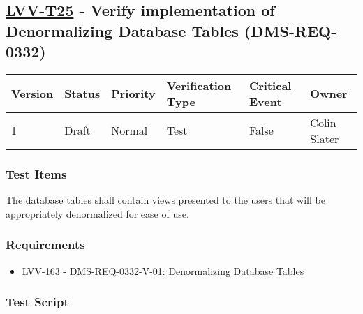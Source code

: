 \hypertarget{lvv-t25---verify-implementation-of-denormalizing-database-tables-dms-req-0332}{%
\subsection{\texorpdfstring{\href{https://jira.lsstcorp.org/secure/Tests.jspa\#/testCase/LVV-T25}{LVV-T25}
- Verify implementation of Denormalizing Database Tables
(DMS-REQ-0332)}{LVV-T25 - Verify implementation of Denormalizing Database Tables (DMS-REQ-0332)}}\label{lvv-t25---verify-implementation-of-denormalizing-database-tables-dms-req-0332}}

\begin{longtable}[]{@{}llllll@{}}
\toprule
Version & Status & Priority & Verification Type & Critical Event &
Owner\tabularnewline
\midrule
\endhead
1 & Draft & Normal & Test & False & Colin Slater\tabularnewline
\bottomrule
\end{longtable}

\hypertarget{test-items-115}{%
\subsubsection{Test Items}\label{test-items-115}}

The database tables shall contain views presented to the users that will
be appropriately denormalized for ease of use.

\hypertarget{requirements-115}{%
\subsubsection{Requirements}\label{requirements-115}}

\begin{itemize}
\tightlist
\item
  \href{https://jira.lsstcorp.org/browse/LVV-163}{LVV-163} -
  DMS-REQ-0332-V-01: Denormalizing Database Tables
\end{itemize}

\hypertarget{test-script-115}{%
\subsubsection{Test Script}\label{test-script-115}}

